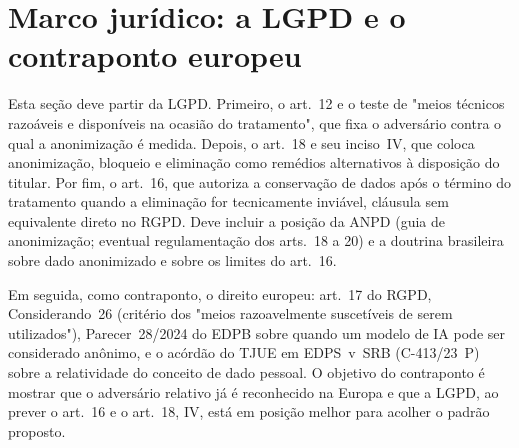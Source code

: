 \section{Marco jurídico: a LGPD e o contraponto europeu}


Esta seção deve partir da LGPD. Primeiro, o art.~12 e o teste de "meios
técnicos razoáveis e disponíveis na ocasião do tratamento", que fixa o
adversário contra o qual a anonimização é medida. Depois, o art.~18 e seu
inciso~IV, que coloca anonimização, bloqueio e eliminação como remédios
alternativos à disposição do titular. Por fim, o art.~16, que autoriza a
conservação de dados após o término do tratamento quando a eliminação for
tecnicamente inviável, cláusula sem equivalente direto no RGPD. Deve incluir a
posição da ANPD (guia de anonimização; eventual regulamentação dos
arts.~18 a 20) e a doutrina brasileira sobre dado anonimizado e sobre os
limites do art.~16.

Em seguida, como contraponto, o direito europeu: art.~17 do RGPD,
Considerando~26 (critério dos "meios razoavelmente suscetíveis de serem
utilizados"), Parecer~28/2024 do EDPB sobre quando um modelo de IA pode ser
considerado anônimo, e o acórdão do TJUE em EDPS~v~SRB (C-413/23~P) sobre a
relatividade do conceito de dado pessoal. O objetivo do contraponto é
mostrar que o adversário relativo já é reconhecido na Europa e que a LGPD,
ao prever o art.~16 e o art.~18, IV, está em posição melhor para acolher o
padrão proposto.

